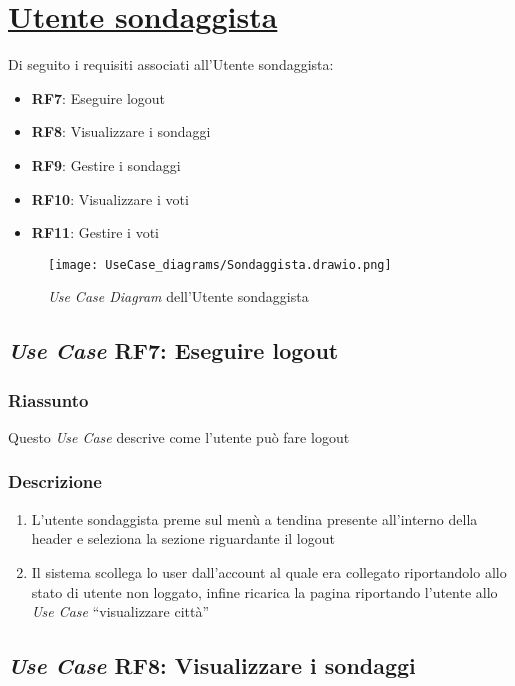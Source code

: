 \section{\underline{Utente sondaggista}}
    Di seguito i requisiti associati all'Utente sondaggista:
    \begin{itemize}
        \item \textbf{RF7}: Eseguire logout
        \item \textbf{RF8}: Visualizzare i sondaggi
        \item \textbf{RF9}: Gestire i sondaggi
        \item \textbf{RF10}: Visualizzare i voti
        \item \textbf{RF11}: Gestire i voti
    \end{itemize}
    \begin{figure}[H]
        \centering
        \texttt{[image: UseCase\_diagrams/Sondaggista.drawio.png]}
        \caption{\textit{Use Case Diagram} dell'Utente sondaggista}
    \end{figure}

    \subsection{\textit{Use Case} RF7: Eseguire logout}
        \subsubsection{Riassunto}
            Questo \textit{Use Case} descrive come l'utente può fare logout
        \subsubsection{Descrizione}
            \begin{enumerate}
                \item L'utente sondaggista preme sul menù a tendina presente all'interno della header e seleziona la sezione riguardante il logout
                \item Il sistema scollega lo user dall'account al quale era collegato riportandolo allo stato di utente non loggato, infine 
                ricarica la pagina riportando l'utente allo \textit{Use Case} ``visualizzare città''
            \end{enumerate}

    \subsection{\textit{Use Case} RF8: Visualizzare i sondaggi}
